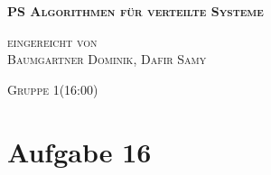\documentclass[12pt,a4paper]{report}
\begin{document}
\begin{titlepage}
	\begin{center}

		\vspace*{1.0cm}
		\huge
		\textsc{\bf{PS Algorithmen für verteilte Systeme}}

		\vspace*{4.0cm}
		\textsc{
			\normalsize{eingereicht von} \\[0.5\baselineskip]
			{\large Baumgartner Dominik, Dafir Samy}
		}

		\vspace*{3.0cm}
		\textsc{
			\normalsize{Gruppe  1(16:00)}
		}

	\end{center}
\end{titlepage}

\section*{Aufgabe 16}
\end{document}
